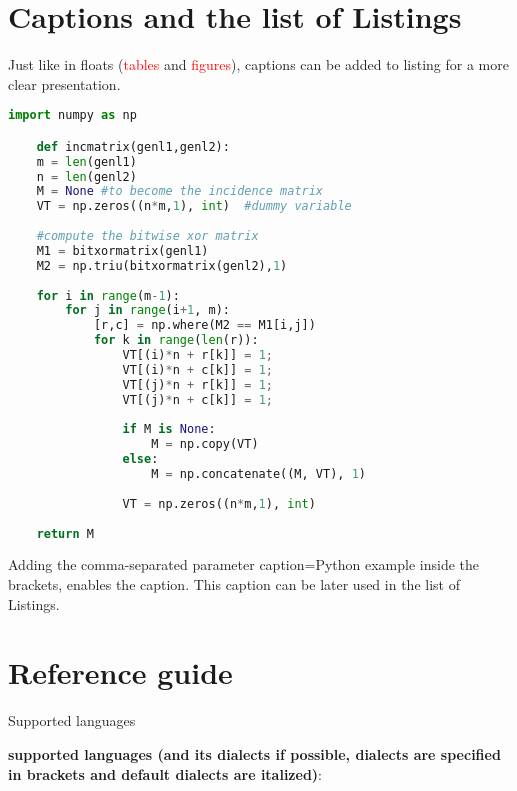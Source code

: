 \section{Captions and the list of Listings}
Just like in floats (\textcolor{red}{tables} and \textcolor{red}{figures}), captions can be added to listing for a more clear presentation.

\begin{lstlisting}[language=Python, morekeywords={as}, caption=Python example]
import numpy as np

	def incmatrix(genl1,genl2):
	m = len(genl1)
	n = len(genl2)
	M = None #to become the incidence matrix
	VT = np.zeros((n*m,1), int)  #dummy variable
	
	#compute the bitwise xor matrix
	M1 = bitxormatrix(genl1)
	M2 = np.triu(bitxormatrix(genl2),1) 
	
	for i in range(m-1):
		for j in range(i+1, m):
			[r,c] = np.where(M2 == M1[i,j])
			for k in range(len(r)):
				VT[(i)*n + r[k]] = 1;
				VT[(i)*n + c[k]] = 1;
				VT[(j)*n + r[k]] = 1;
				VT[(j)*n + c[k]] = 1;
				
				if M is None:
					M = np.copy(VT)
				else:
					M = np.concatenate((M, VT), 1)
				
				VT = np.zeros((n*m,1), int)
	
	return M
\end{lstlisting}

Adding the comma-separated parameter caption=Python example inside the brackets, enables the caption. This caption can be later used in the list of Listings.


\section{Reference guide}
Supported languages

\textbf{supported languages (and its dialects if possible, dialects are specified in brackets and default dialects are italized)}:

